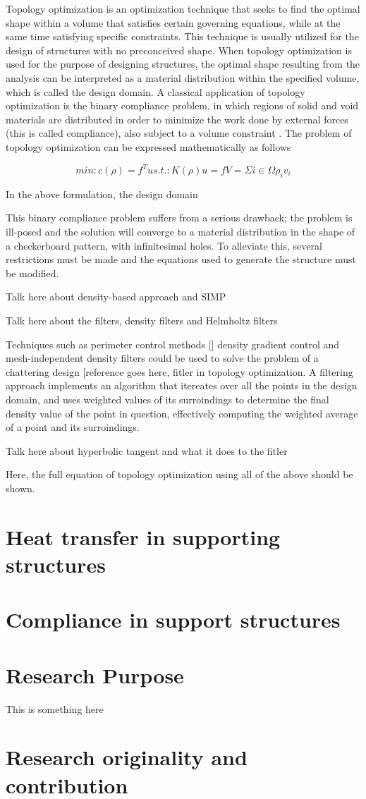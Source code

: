 \documentclass[../main.tex]{subfiles}
\begin{document}
Topology optimization is an optimization technique that seeks to find the optimal shape within a volume that satisfies certain governing equations, while at the same time satisfying specific constraints. This technique is usually utilized for the design of structures with no preconceived shape. When topology optimization is used for the purpose of designing structures, the optimal shape resulting from the analysis can be interpreted as a material distribution within the specified volume, which is called the design domain. A classical application of topology optimization is the binary compliance problem, in which regions of solid and void materials are distributed in order to minimize the work done by external forces (this is called compliance), also subject to a volume constraint \cite{liuEfficient3DTopology2014}. The problem of topology optimization can be expressed mathematically as follows \cite{lazarovFiltersTopologyOptimization2011}

\begin{equation}
  \label{eq:topopt_eq}
  min: c(\rho) = f^T u 
  s.t. : K(\rho)u = f 
  V = \Sigma i \in \Omega \rho_i v_i
\end{equation}

In the above formulation, the design domain 

This binary compliance problem suffers from a serious drawback; the problem is ill-posed and the solution will converge to a material distribution in the shape of a checkerboard pattern, with infinitesimal holes. To alleviate this, several restrictions must be made  and the equations used to generate the structure must be modified. 

Talk here about density-based approach and SIMP 

Talk here about the filters, density filters and Helmholtz filters

Techniques such as perimeter control methods [] density gradient control 
and mesh-independent density filters could be used to solve the problem of a chattering design [reference goes here, fitler in topology optimization. A filtering approach implements an algorithm that itereates over all the points in the design domain, and uses weighted values of its surroindings to determine the final density value of the point in question, effectively computing the weighted average of a point and its surroindings.

Talk here about hyperbolic tangent and what it does to the fitler

Here, the full equation of topology optimization using all of the above should be shown.

\section{Heat transfer in supporting structures}

\section{Compliance in support structures}

\section{Research Purpose}
 
This is something here

\section{Research originality and contribution}
\end{document}

